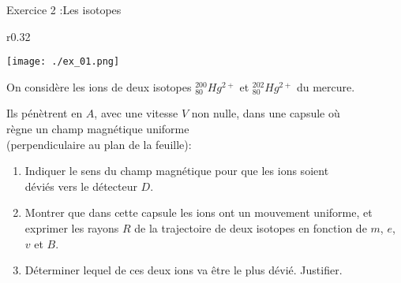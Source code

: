 \documentclass[12pt, french]{article}
\begin{document}
\begin{Box2}{Exercice 2 :Les isotopes }
	\begin{wrapfigure}[1]{r}{0.32\textwidth}
  \begin{center}
	  \vspace{-0.6cm}
	\texttt{[image: ./ex\_01.png]}
  \end{center}
\end{wrapfigure}


	On considère les ions de deux isotopes $^{200}_{80}Hg^{2+}$ et $^{202}_{80}Hg^{2+}$ du mercure.

Ils pénètrent en $A$, avec une vitesse $V$ non nulle, dans une capsule où \\règne un champ magnétique uniforme
\\(perpendiculaire au plan de la feuille):
\begin{enumerate}

	\item Indiquer le sens du champ magnétique pour que les ions soient\\
déviés vers le détecteur $D$.
\item Montrer que dans cette capsule les ions ont un mouvement
uniforme, et exprimer les rayons $R$ de la trajectoire de deux
isotopes en fonction de $m$, $e$, $v$ et $B$.
\item Déterminer lequel de ces deux ions va être le plus dévié.
Justifier.
\end{enumerate}
\end{Box2}
\end{document}
